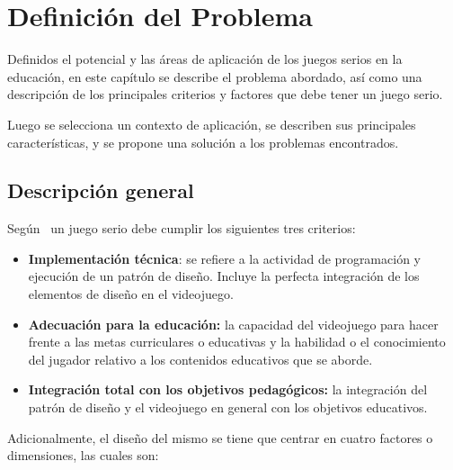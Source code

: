 \chapter{Definición del Problema}
\label{chap:problema}


Definidos el potencial y las áreas de aplicación de los juegos serios en la
educación, en este capítulo se describe el problema abordado, así como una
descripción de los principales criterios y factores que debe tener un juego
serio.

Luego se selecciona un contexto de aplicación, se describen sus principales
características, y se propone una solución a los problemas encontrados.


\section{Descripción general}

Según~\cite{education:games} un juego serio debe cumplir los siguientes tres
criterios:

\begin{itemize}

\item \textbf{Implementación técnica}: se refiere a la actividad de programación
    y ejecución de un patrón de diseño. Incluye la perfecta integración de los
    elementos de diseño en el videojuego. 

\item \textbf{Adecuación para la educación:} la capacidad del videojuego para hacer
    frente a las metas curriculares o educativas y la habilidad o el
    conocimiento del jugador relativo a los contenidos educativos que se aborde.

\item \textbf{Integración total con los objetivos pedagógicos:} la integración
    del patrón de diseño y el videojuego en general con los objetivos
    educativos.

\end{itemize}

Adicionalmente, el diseño del mismo se tiene que centrar en cuatro factores o
dimensiones, las cuales son\cite{education:games}:

